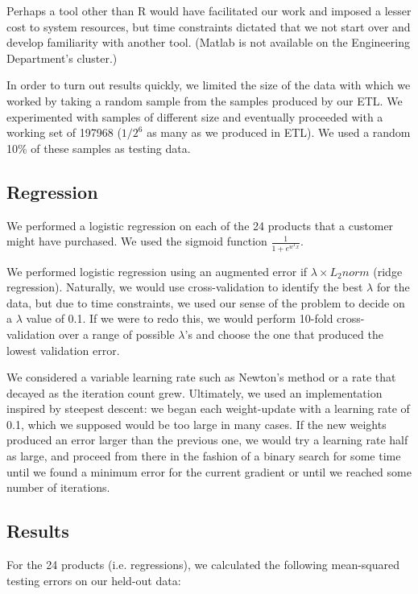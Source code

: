 \documentclass{article}
\begin{document}
\begin{spacing}{1}
\begin{large}
Perhaps a tool other than R would have facilitated our work and imposed a lesser cost to system resources, but time constraints dictated that we not start over and develop familiarity with another tool. (Matlab is not available on the Engineering Department's cluster.)

In order to turn out results quickly, we limited the size of the data with which we worked by taking a random sample from the samples produced by our ETL. We experimented with samples of different size and eventually proceeded with a working set of 197968 ($1/2^6$ as many as we produced in ETL). We used a random 10\% of these samples as testing data.

\subsection{Regression}

We performed a logistic regression on each of the 24 products that a customer might have purchased. We used the sigmoid function $\frac{1}{1+e^{w^Tx}}$.

We performed logistic regression using an augmented error if $\lambda \times L_2norm$ (ridge regression). Naturally, we would use cross-validation to identify the best $\lambda$ for the data, but due to time constraints, we used our sense of the problem to decide on a $\lambda$ value of 0.1. If we were to redo this, we would perform 10-fold cross-validation over a range of possible $\lambda$'s and choose the one that produced the lowest validation error.

We considered a variable learning rate such as Newton's method or a rate that decayed as the iteration count grew. Ultimately, we used an implementation inspired by steepest descent: we began each weight-update with a learning rate of 0.1, which we supposed would be too large in many cases. If the new weights produced an error larger than the previous one, we would try a learning rate half as large, and proceed from there in the fashion of a binary search for some time until we found a minimum error for the current gradient or until we reached some number of iterations.

\subsection{Results}

For the 24 products (i.e. regressions), we calculated the following mean-squared testing errors on our held-out data:


\end{large}
\end{spacing}
\end{document}
